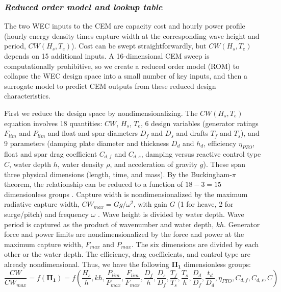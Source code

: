 \documentclass[10pt,twoside]{article}
\begin{document}
\subsubsection{\textit{Reduced order model and lookup table}}
The two WEC inputs to the CEM are capacity cost and hourly power profile (hourly energy density times capture width at the corresponding wave height and period, $CW(H_s,T_e)$).
Cost can be swept straightforwardly, but $CW(H_s,T_e)$ depends on 15 additional inputs. 
A 16-dimensional CEM sweep is computationally prohibitive, so we create a reduced order model (ROM) to collapse the WEC design space into a small number of key inputs, and then a surrogate model to predict CEM outputs from these reduced design characteristics.

First we reduce the design space by nondimensionalizing.
The $CW(H_s,T_e)$ equation involves 18 quantities: $CW$, $H_s$, $T_e$, 
6 design variables (generator ratings $F_{lim}$ and $P_{lim}$ and float and spar diameters $D_f$ and $D_s$ and drafts $T_f$ and $T_s$), 
and 9 parameters (damping plate diameter and thickness $D_d$ and $h_d$, efficiency $\eta_{PTO}$, float and spar drag coefficient $C_{d,f}$ and $C_{d,s}$, damping versus reactive control type $C$, water depth $h$, water density $\rho$, and acceleration of gravity $g$). 
These span three physical dimensions (length, time, and mass).
By the Buckingham-$\pi$ theorem, the relationship can be reduced to a function of $18-3=15$ dimensionless groups \cite{mckinley-buckingham-2021}. 
Capture width is nondimensionalized by the maximum radiative capture width, $CW_{max}=Gg/\omega^2$, with gain $G$ (1 for heave, 2 for surge/pitch) and frequency $\omega$ \cite{zou_practical_2023}. %
Wave height is divided by water depth. %
Wave period is captured as the product of wavenumber and water depth, $kh$. %
Generator force and power limits are nondimensionalized by the force and power at the maximum capture width, $F_{max}$ and $P_{max}$. %
The six dimensions are divided by each other or the water depth.%
The efficiency, drag coefficients, and control type are already nondimensional. %
Thus, we have the following $\mathbf{\Pi_1}$ dimensionless groups:
\begin{equation}
    \frac{CW}{CW_{max}} = f\left( \mathbf{\Pi_1} \right) = f\left(\frac{H_s}{h}, kh, 
    \frac{P_{lim}}{P_{max}}, \frac{F_{lim}}{F_{max}},
    \frac{D_f}{h}, \frac{D_s}{D_f}, \frac{T_f}{T_s}, \frac{T_s}{h}, \frac{D_d}{D_f}, \frac{t_d}{D_d}, 
    \eta_{PTO}, C_{d,f}, C_{d,s},  C\right)
\end{equation}
\end{document}
